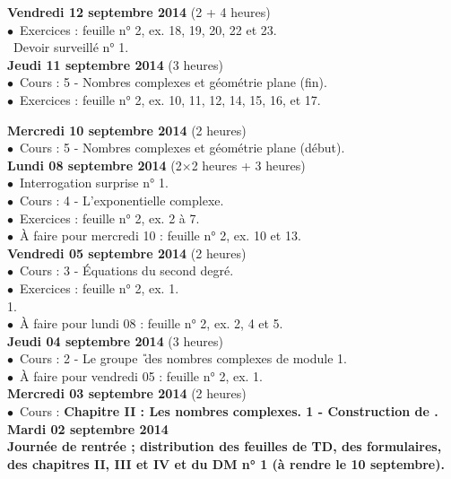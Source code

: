 \documentclass[12pt,a4paper]{article}
\begin{document}
\noindent\textbf{ \bf Vendredi 12 septembre 2014 \rm}(2 + 4 heures)\\
$\bullet$\ Exercices : feuille n° 2, ex. 18, 19, 20, 22 et 23.\\
\bu\ Devoir surveillé n° 1.\vspace{.4cm}\\

\noindent\textbf{ \bf Jeudi 11 septembre 2014 \rm}(3 heures)\\
$\bullet$\ Cours : 5 - Nombres complexes et géométrie plane (fin).\\
$\bullet$\ Exercices : feuille n° 2, ex. 10, 11, 12, 14, 15, 16, et 17.

\noindent\textbf{ \bf Mercredi 10 septembre 2014 \rm}(2 heures)\\
$\bullet$\ Cours : 5 - Nombres complexes et géométrie plane
(début).\vspace{.4cm}\\
 
\noindent\textbf{ \bf Lundi 08 septembre 2014 \rm}(2$\times$2 heures + 3
heures)\\
$\bullet$\ Interrogation surprise n° 1.\\
$\bullet$\ Cours : 4 - L'exponentielle complexe.\\
$\bullet$\ Exercices : feuille n° 2, ex. 2 à 7.\\
$\bullet$\ À faire pour mercredi 10 : feuille n° 2, ex. 10 et 13.\vspace{.4cm}\\
 
\noindent\textbf{ \bf Vendredi 05 septembre 2014 \rm}(2 heures)\\
$\bullet$\ Cours : 3 - Équations du second degré.\\
$\bullet$\ Exercices : feuille n° 2, ex. 1.\\
1.\\$\bullet$\ À faire pour lundi 08 : feuille n° 2, ex. 2, 4 et
5.\vspace{.4cm}\\

\noindent\textbf{ \bf Jeudi 04 septembre 2014 \rm}(3 heures)\\
$\bullet$\ Cours : 2 - Le groupe \U\ des nombres complexes de module
1.\\$\bullet$\ À faire pour vendredi 05 : feuille n° 2, ex. 1.\vspace{.4cm}\\

\noindent\textbf{\bf Mercredi 03 septembre 2014 \rm} (2 heures)\\
$\bullet$\ Cours : \bf Chapitre II \rm : Les nombres complexes. 1 - Construction
de \C.\vspace{.4cm}\\

\noindent\textbf{\bf Mardi 02 septembre 2014 \rm}\\
Journée de rentrée ; distribution des feuilles de TD, des formulaires, des
chapitres II, III et IV et du DM n° 1 (à
rendre le 10 septembre).

\label{end}
\end{document}
